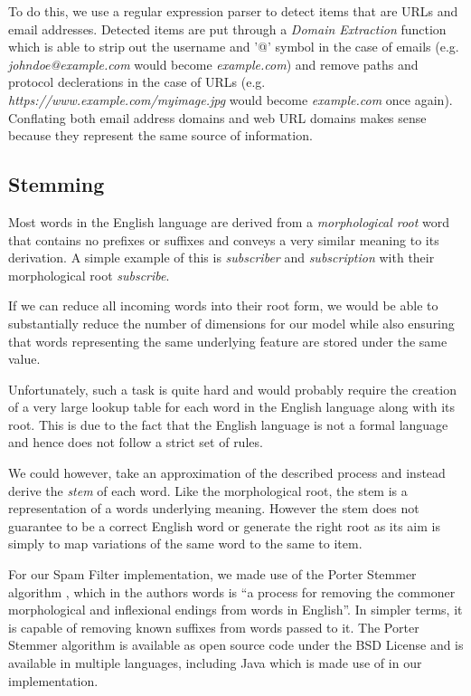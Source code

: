 To do this, we use a regular expression parser to detect items that are URLs and email addresses. Detected items are put through a \emph{Domain Extraction} function which is able to strip out the username and '@' symbol in the case of emails (e.g. \emph{johndoe@example.com} would become \emph{example.com}) and remove paths and protocol declerations in the case of URLs (e.g. \emph{https://www.example.com/myimage.jpg} would become \emph{example.com} once again). Conflating both email address domains and web URL domains makes sense because they represent the same source of information.


\subsection{Stemming}
Most words in the English language are derived from a \emph{morphological root} word that contains no prefixes or suffixes and conveys a very similar meaning to its derivation. A simple example of this is \emph{subscriber} and \emph{subscription} with their morphological root \emph{subscribe}. 

If we can reduce all incoming words into their root form, we would be able to substantially reduce the number of dimensions for our model while also ensuring that words representing the same underlying feature are stored under the same value.

Unfortunately, such a task is quite hard and would probably require the creation of a very large lookup table for each word in the English language along with its root. This is due to the fact that the English language is not a formal language and hence does not follow a strict set of rules. 

We could however, take an approximation of the described process and instead derive the \emph{stem} of each word. Like the morphological root, the stem is a representation of a words underlying meaning. However the stem does not guarantee to be a correct English word or generate the right root as its aim is simply to map variations of the same word to the same to item. 

For our Spam Filter implementation, we made use of the Porter Stemmer algorithm \cite{porter1980}, which in the authors words is ``a process for removing the commoner morphological and inflexional endings from words in English''. In simpler terms, it is capable of removing known suffixes from words passed to it. The Porter Stemmer algorithm is available as open source code under the BSD License and is available in multiple languages, including Java which is made use of in our implementation.

